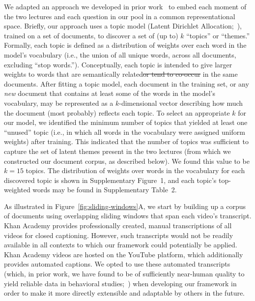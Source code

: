 \documentclass[10pt]{article}
\newcommand{\topics}{2}
\newcommand{\topicWordWeights}{1}
\providecommand{\DIFaddtex}[1]{{\protect\color{blue}\uwave{#1}}} %
\providecommand{\DIFdeltex}[1]{{\protect\color{red}\sout{#1}}}                      %
\providecommand{\DIFaddbegin}{} %
\providecommand{\DIFaddend}{} %
\providecommand{\DIFdelbegin}{} %
\providecommand{\DIFdelend}{} %
\providecommand{\DIFadd}[1]{\texorpdfstring{\DIFaddtex{#1}}{#1}} %
\providecommand{\DIFdel}[1]{\texorpdfstring{\DIFdeltex{#1}}{}} %
\newcommand{\DIFscaledelfig}{0.5}
\newlength{\DIFdelgraphicswidth} %
\newlength{\DIFdelgraphicsheight} %
\newcommand{\DIFaddincludegraphics}[2][]{{\color{blue}\fbox{\DIFOincludegraphics[#1]{#2}}}} %
\newcommand{\DIFdelincludegraphics}[2][]{%
\sbox{\DIFdelgraphicsbox}{\DIFOincludegraphics[#1]{#2}}%
\settoboxwidth{\DIFdelgraphicswidth}{\DIFdelgraphicsbox} %
\settoboxtotalheight{\DIFdelgraphicsheight}{\DIFdelgraphicsbox} %
\scalebox{\DIFscaledelfig}{%
\parbox[b]{\DIFdelgraphicswidth}{\usebox{\DIFdelgraphicsbox}\\[-\baselineskip] \rule{\DIFdelgraphicswidth}{0em}}\llap{\resizebox{\DIFdelgraphicswidth}{\DIFdelgraphicsheight}{%
\setlength{\unitlength}{\DIFdelgraphicswidth}%
\begin{picture}(1,1)%
\thicklines\linethickness{2pt} %
{\color[rgb]{1,0,0}\put(0,0){\framebox(1,1){}}}%
{\color[rgb]{1,0,0}\put(0,0){\line( 1,1){1}}}%
{\color[rgb]{1,0,0}\put(0,1){\line(1,-1){1}}}%
\end{picture}%
}\hspace*{3pt}}} %
} %
\DeclareRobustCommand{\DIFaddbegin}{\DIFOaddbegin \let\includegraphics\DIFaddincludegraphics} %
\DeclareRobustCommand{\DIFaddend}{\DIFOaddend \let\includegraphics\DIFOincludegraphics} %
\DeclareRobustCommand{\DIFdelbegin}{\DIFOdelbegin \let\includegraphics\DIFdelincludegraphics} %
\DeclareRobustCommand{\DIFdelend}{\DIFOaddend \let\includegraphics\DIFOincludegraphics} %
\begin{document}
We adapted an approach we developed in prior work~\citep{HeusEtal21} to embed
each moment of the two lectures and each question in our pool in a common
representational space. Briefly, our approach uses a topic model (Latent
Dirichlet Allocation;~\citealp{BleiEtal03}), trained on a set of documents, to
discover a set of (up to) $k$ ``topics'' or ``themes.'' Formally, each topic is
defined as a distribution of weights over each word in the model's vocabulary
(i.e., the union of all unique words, across all documents, excluding ``stop
words.''). Conceptually, each topic is intended to give larger weights to words
that are semantically related\DIFdelbegin \DIFdel{or tend to co-occur }\DIFdelend \DIFaddbegin \DIFadd{, as implied by their co-occurring }\DIFaddend in the same documents. After
fitting a topic model, each document in the training set, or any \textit{new}
document that contains at least some of the words in the model's vocabulary,
may be represented as a $k$-dimensional vector describing how much the document
(most probably) reflects each topic. To select an appropriate $k$ for our
model, we identified the minimum number of topics that yielded at least one
``unused'' topic (i.e., in which all words in the vocabulary were assigned
uniform weights) after training. This indicated that the number of topics was
sufficient to capture the set of latent themes present in the two lectures
(from which we constructed our document corpus, as described below). We found
this value to be $k = 15$ topics. The distribution of weights over words in the
vocabulary for each discovered topic is shown in Supplementary
Figure~\topicWordWeights, and each topic's top-weighted words may be found in
Supplementary Table~\topics.

As illustrated in Figure~\ref{fig:sliding-windows}A, we start by building up a
corpus of documents using overlapping sliding windows that span each video's
transcript. Khan Academy provides professionally created, manual transcriptions
of all videos for closed captioning. However, such transcripts would not be
readily available in all contexts to which our framework could potentially be
applied. Khan Academy videos are hosted on the YouTube platform, which
additionally provides automated captions. We opted to use these automated
transcripts (which, in prior work, we have found to be of sufficiently
near-human quality to yield reliable data in behavioral
studies;~\citealp{ZimaEtal18}) when developing our framework in order to make
it more directly extensible and adaptable by others in the future.
\end{document}
